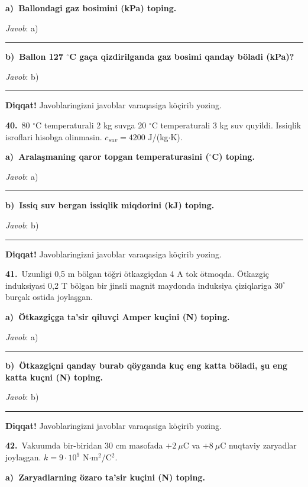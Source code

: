 \documentclass[11pt,a4paper]{article}
\newcommand{\blank}{\rule{5cm}{0.4pt}}
\begin{document}
\medskip\noindent\textbf{a)\ Ballondagi gaz bosimini (kPa) toping.}\par
\noindent\textit{Javob}: a)\ \blank\par
\medskip\noindent\textbf{b)\ Ballon 127 $^\circ$C gaça qizdirilganda gaz bosimi qanday böladi (kPa)?}\par
\noindent\textit{Javob}: b)\ \blank\par
\medskip\noindent\textbf{Diqqat!} Javoblaringizni javoblar varaqasiga köçirib yozing.\par\vspace{10pt}
\noindent\textbf{40.}\ 80 $^\circ$C temperaturali 2 kg suvga 20 $^\circ$C temperaturali 3 kg suv quyildi. Issiqlik isroflari hisobga olinmasin. $c_{suv}=4200$ J/(kg$\cdot$K).\par\smallskip
\medskip\noindent\textbf{a)\ Aralaşmaning qaror topgan temperaturasini ($^\circ$C) toping.}\par
\noindent\textit{Javob}: a)\ \blank\par
\medskip\noindent\textbf{b)\ Issiq suv bergan issiqlik miqdorini (kJ) toping.}\par
\noindent\textit{Javob}: b)\ \blank\par
\medskip\noindent\textbf{Diqqat!} Javoblaringizni javoblar varaqasiga köçirib yozing.\par\vspace{10pt}
\noindent\textbf{41.}\ Uzunligi 0,5 m bölgan töğri ötkazgiçdan 4 A tok ötmoqda. Ötkazgiç induksiyasi 0,2 T bölgan bir jinsli magnit maydonda induksiya çiziqlariga $30^\circ$ burçak ostida joylaşgan.\par\smallskip
\medskip\noindent\textbf{a)\ Ötkazgiçga ta’sir qiluvçi Amper kuçini (N) toping.}\par
\noindent\textit{Javob}: a)\ \blank\par
\medskip\noindent\textbf{b)\ Ötkazgiçni qanday burab qöyganda kuç eng katta böladi, şu eng katta kuçni (N) toping.}\par
\noindent\textit{Javob}: b)\ \blank\par
\medskip\noindent\textbf{Diqqat!} Javoblaringizni javoblar varaqasiga köçirib yozing.\par\vspace{10pt}
\noindent\textbf{42.}\ Vakuumda bir-biridan 30 cm masofada $+2\ \mu$C va $+8\ \mu$C nuqtaviy zaryadlar joylaşgan. $k=9\cdot10^9$ N$\cdot$m$^2$/C$^2$.\par\smallskip
\medskip\noindent\textbf{a)\ Zaryadlarning özaro ta’sir kuçini (N) toping.}\par
\end{document}
